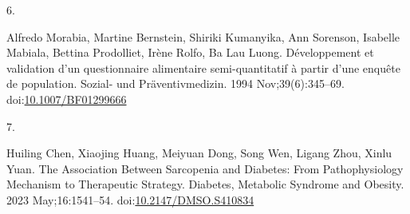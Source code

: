 \documentclass[
  11pt,
]{article}
\newlength{\cslhangindent}
\newlength{\csllabelwidth}
\newenvironment{CSLReferences}[2] %
 {\begin{list}{}{%
  \setlength{\itemindent}{0pt}
  \setlength{\leftmargin}{0pt}
  \setlength{\parsep}{0pt}
  \ifodd #1
   \setlength{\leftmargin}{\cslhangindent}
   \setlength{\itemindent}{-1\cslhangindent}
  \fi
  \setlength{\itemsep}{#2\baselineskip}}}
 {\end{list}}
\newcommand{\CSLLeftMargin}[1]{\parbox[t]{\csllabelwidth}{\strut#1\strut}}
\newcommand{\CSLRightInline}[1]{\parbox[t]{\linewidth - \csllabelwidth}{\strut#1\strut}}
\begin{document}
\begin{CSLReferences}{0}{1}
\CSLLeftMargin{6. }%
\CSLRightInline{Alfredo Morabia, Martine Bernstein, Shiriki Kumanyika,
Ann Sorenson, Isabelle Mabiala, Bettina Prodolliet, Irène Rolfo, Ba Lau
Luong. {Développement et validation d'un questionnaire alimentaire
semi-quantitatif à partir d'une enquête de population}. Sozial- und
Präventivmedizin. 1994 Nov;39(6):345--69.
doi:\href{https://doi.org/10.1007/BF01299666}{10.1007/BF01299666}}

\CSLLeftMargin{7. }%
\CSLRightInline{Huiling Chen, Xiaojing Huang, Meiyuan Dong, Song Wen,
Ligang Zhou, Xinlu Yuan. The {Association Between Sarcopenia} and
{Diabetes}: {From Pathophysiology Mechanism} to {Therapeutic Strategy}.
Diabetes, Metabolic Syndrome and Obesity. 2023 May;16:1541--54.
doi:\href{https://doi.org/10.2147/DMSO.S410834}{10.2147/DMSO.S410834}}

\end{CSLReferences}
\end{document}
